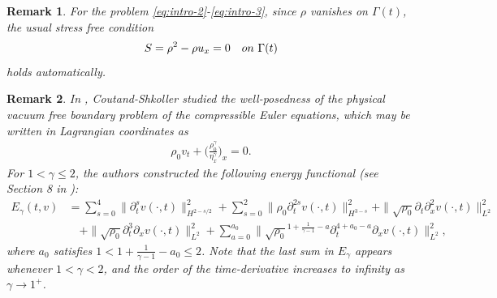 \documentclass[11pt, reqno]{amsart}
\newtheorem{remark}{Remark}
\numberwithin{equation}{section}
\begin{document}
\begin{remark}\label{re:main-3} 
For the problem \eqref{eq:intro-2}-\eqref{eq:intro-3}, since \(\rho\) vanishes on \(\Gamma(t)\),  
the usual stress free condition
\begin{align}\label{r3}
S=\rho^2-\rho u_x=0\quad \rm{on}\ \Gamma(t)
\end{align}
holds automatically. 



\end{remark}


\begin{remark}\label{re:main-4}
 In \cite{MR2779087}, Coutand-Shkoller studied the well-posedness of the physical vacuum free boundary problem of the compressible Euler equations, which may be written in Lagrangian coordinates as
\begin{align}\label{r3.5}
	\rho_0v_t+\bigg({\frac{\rho_0^\gamma}{\eta_x^\gamma}}\bigg)_x
	=0.
\end{align}
For \(1<\gamma\leq 2\), the authors constructed the following energy functional (see Section 8 in \cite{MR2779087}):
\begin{equation}\label{CS'energy function}
\begin{aligned}
	E_\gamma(t,v)&=\sum_{s=0}^4\|\partial_t^sv(\cdot, t)\|_{H^{2-s/2}}^2+\sum_{s=0}^2\|\rho_0\partial_t^{2s}v(\cdot, t)\|_{H^{3-s}}^2+\|\sqrt{\rho_0}\partial_t\partial_x^2v(\cdot, t)\|_{L^2}^2\\
&\quad+\|\sqrt{\rho_0}\partial_t^3\partial_xv(\cdot, t)\|_{L^2}^2
+\sum_{a=0}^{a_0}\|\sqrt{\rho_0}^{1+\frac{1}{\gamma-1}-a}\partial_t^{4+a_0-a}\partial_xv(\cdot,t)\|_{L^2}^2,
\end{aligned}
\end{equation}
where \(a_0\) satisfies \(1<1+\frac{1}{\gamma-1}-a_0\leq 2\). Note that the last sum in \(E_\gamma\) appears whenever \(1<\gamma< 2\), and the order of the time-derivative increases to infinity as \(\gamma\to 1^+\). 


\end{remark}
\end{document}
